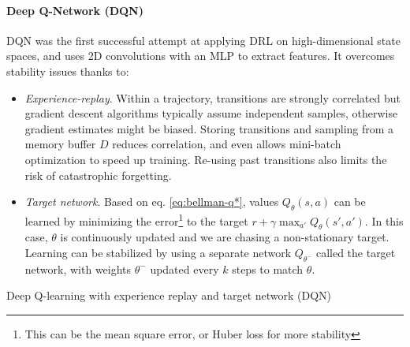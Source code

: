 \paragraph{Deep Q-Network (DQN) \cite{mnih2013playing}\cite{mnih2015human}} DQN was the first successful attempt at applying DRL on high-dimensional state spaces, and uses 2D convolutions with an MLP to extract features. It overcomes stability issues thanks to:
\begin{itemize}
    \item \emph{Experience-replay}. Within a trajectory, transitions are strongly correlated but gradient descent algorithms typically assume independent samples, otherwise gradient estimates might be biased. Storing transitions and sampling from a memory buffer $D$ reduces correlation, and even allows mini-batch optimization to speed up training. Re-using past transitions also limits the risk of catastrophic forgetting.
    \item \emph{Target network}. Based on eq. \ref{eq:bellman-q*}, values $Q_\theta(s,a)$ can be learned by minimizing the error\footnote{This can be the mean square error, or Huber loss for more stability} to the target $r + \gamma \max_{a'}Q_\theta(s',a')$. In this case, $\theta$ is continuously updated and we are chasing a non-stationary target. Learning can be stabilized by using a separate network $Q_{\theta^-}$ called the target network, with weights $\theta^-$ updated every $k$ steps to match $\theta$.
\end{itemize}

\begin{algorithm}[H]
\DontPrintSemicolon
{}
\caption{Deep Q-learning with experience replay and target network (DQN)}
\label{algo:DQN}
\end{algorithm}

